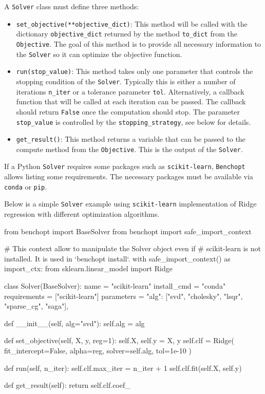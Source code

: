 \documentclass{article}
\newcommand{\Benchopt}{{{\texttt{Benchopt}}}}
\begin{document}
A \texttt{Solver} class must define three methods:
\begin{itemize}[topsep=0pt,itemsep=1ex,partopsep=0ex,parsep=0ex,leftmargin=3ex]
    \item \texttt{set\_objective(**objective\_dict)}: This method will be called with the dictionary \texttt{objective\_dict} returned by the method \texttt{to\_dict} from the \texttt{Objective}. The goal of this method is to provide all necessary information to the \texttt{Solver} so it can optimize the objective function.
    \item \texttt{run(stop\_value)}: This method takes only one parameter that controls the stopping condition of the \texttt{Solver}. Typically this is either a number of iterations \texttt{n\_iter} or a tolerance parameter \texttt{tol}. Alternatively, a callback function that will be called at each iteration can be passed. The callback should return \texttt{False} once the computation should stop. The parameter \texttt{stop\_value} is controlled by the \texttt{stopping\_strategy}, see below for details.
    \item \texttt{get\_result()}: This method returns a variable that can be passed to the compute method from the \texttt{Objective}. This is the output of the \texttt{Solver}.
\end{itemize}

If a Python \texttt{Solver} requires some packages such as \texttt{scikit-learn}, \Benchopt{} allows listing some requirements.
The necessary packages must be available via \texttt{conda} or \texttt{pip}.

Below is a simple \texttt{Solver} example using \texttt{scikit-learn} implementation of Ridge regression with different optimization algorithms.

\newpage
\begin{python}
from benchopt import BaseSolver
from benchopt import safe_import_context

# This context allow to manipulate the Solver object even if
# scikit-learn is not installed. It is used in `benchopt install`.
with safe_import_context() as import_ctx:
    from sklearn.linear_model import Ridge


class Solver(BaseSolver):
    name = "scikit-learn"
    install_cmd = "conda"
    requirements = ["scikit-learn"]
    parameters = {
        "alg": ["svd", "cholesky", "lsqr", "sparse_cg", "saga"],
    }

    def __init__(self, alg="svd"):
        self.alg = alg

    def set_objective(self, X, y, reg=1):
        self.X, self.y  = X, y
        self.clf = Ridge(
            fit_intercept=False, alpha=reg, solver=self.alg,
            tol=1e-10
        )

    def run(self, n_iter):
        self.clf.max_iter = n_iter + 1
        self.clf.fit(self.X, self.y)

    def get_result(self):
        return self.clf.coef_
\end{python}
\end{document}
